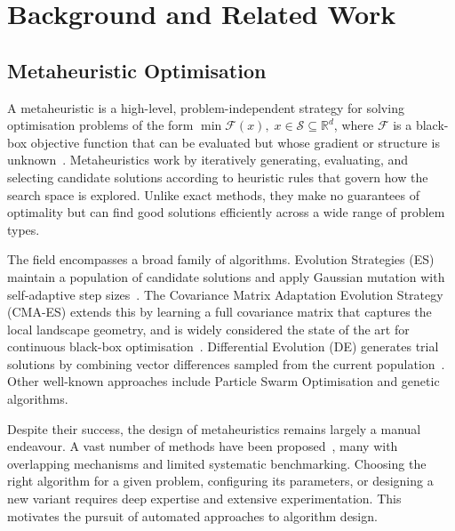 
\chapter{Background and Related Work}
\label{ch:background}

\section{Metaheuristic Optimisation}
\label{sec:bg-metaheuristics}

A metaheuristic is a high-level, problem-independent strategy for solving optimisation problems of the form $\min \mathcal{F}(x),\; x \in \mathcal{S} \subseteq \mathbb{R}^d$, where $\mathcal{F}$ is a black-box objective function that can be evaluated but whose gradient or structure is unknown~\cite{eiben2015introduction}. Metaheuristics work by iteratively generating, evaluating, and selecting candidate solutions according to heuristic rules that govern how the search space is explored. Unlike exact methods, they make no guarantees of optimality but can find good solutions efficiently across a wide range of problem types.

The field encompasses a broad family of algorithms. Evolution Strategies (ES) maintain a population of candidate solutions and apply Gaussian mutation with self-adaptive step sizes~\cite{back1996evolutionary}. The Covariance Matrix Adaptation Evolution Strategy (CMA-ES) extends this by learning a full covariance matrix that captures the local landscape geometry, and is widely considered the state of the art for continuous black-box optimisation~\cite{hansen2001cmaes}. Differential Evolution (DE) generates trial solutions by combining vector differences sampled from the current population~\cite{storn1997de}. Other well-known approaches include Particle Swarm Optimisation and genetic algorithms.

Despite their success, the design of metaheuristics remains largely a manual endeavour. A vast number of methods have been proposed~\cite{eiben2015introduction}, many with overlapping mechanisms and limited systematic benchmarking. Choosing the right algorithm for a given problem, configuring its parameters, or designing a new variant requires deep expertise and extensive experimentation. This motivates the pursuit of automated approaches to algorithm design.

